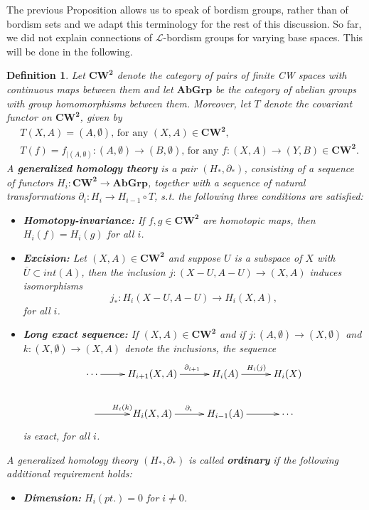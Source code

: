 \documentclass[11pt]{book}
\newtheorem{definition}{Definition}
\begin{document}
The previous Proposition allows us to speak of bordism groups, rather than of bordism sets and we adapt this terminology for the rest of this discussion. \newline So far, we did not explain connections of $\mathcal{L}$-bordism groups for varying base spaces. This will be done in the following.

\begin{definition}
Let $\boldsymbol{CW^2}$ denote the category of pairs of finite CW spaces with continuous maps between them and let $\boldsymbol{AbGrp}$ be the category of abelian groups with group homomorphisms between them. Moreover, let $T$ denote the covariant functor on $\boldsymbol{CW^2}$, given by
\begin{align*}
&T(X,A) = (A, \emptyset) \text{, for any } (X,A) \in \boldsymbol{CW^2},  \\
&T(f) = f_{|(A, \emptyset)} : (A, \emptyset) \to (B, \emptyset) \text{, for any } f: (X,A) \to (Y,B) \in \boldsymbol{CW^2}.
\end{align*}
A \textbf{generalized homology theory} is a pair $(H_*, \partial_*)$, consisting of a sequence of functors $H_i : \boldsymbol{CW^2} \to \boldsymbol{AbGrp}$, together with a sequence of natural transformations $\partial_i : H_i \to H_{i-1} \circ T$, s.t. the following three conditions are satisfied: \begin{itemize}
\item[1.] \textbf{Homotopy-invariance:} If $f,g \in \boldsymbol{CW^2}$ are homotopic maps, then $H_i(f)=H_i(g)$ for all $i$.
\item[2.] \textbf{Excision:} Let $(X,A) \in \boldsymbol{CW^2}$ and suppose $U$ is a subspace of $X$ with $\overline{U} \subset int(A)$, then the inclusion $j: (X-U,A-U) \to (X,A)$ induces isomorphisms 
\begin{equation*}
j_* : H_i(X-U,A-U) \to H_i(X,A),
\end{equation*}
for all $i$.
\item[3.] \textbf{Long exact sequence:} If $(X,A) \in \boldsymbol{CW^2}$ and if $j: (A, \emptyset) \to (X, \emptyset)$ and $k: (X, \emptyset) \to (X,A)$ denote the inclusions, the sequence
\begin{equation*}
\begin{xy}
\xymatrix{ 
\cdots \ar[r]^{}     &   H_{i+1}(X,A) \ar[r]^{\ \ \partial_{i+1}}    &   H_i(A) \ar[r]^{H_i(j)}   &  H_i(X) \\
  \ar[r]^{H_i(k)}   &   H_i(X,A)  \ar[r]^{\partial_i}   &   H_{i-1}(A) \ar[r]^{}   &   \cdots
}
\end{xy}
\end{equation*}
is exact, for all $i$.
\end{itemize}
A generalized homology theory $(H_*, \partial_*)$ is called \textbf{ordinary} if the following additional requirement holds:
\begin{itemize}
\item[4.] \textbf{Dimension:} $H_i(pt.)=0$ for $i \neq 0$.
\end{itemize}
\end{definition}
\end{document}
